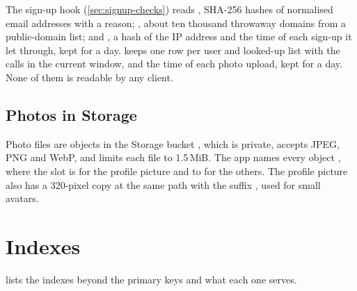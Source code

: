 The sign-up hook (\cref{sec:signup-checks}) reads , SHA-256 hashes of
normalised email addresses with a reason; , about ten thousand
throwaway domains from a public-domain list; and , a hash of the IP address and
the time of each sign-up it let through, kept for a day.  keeps one row per user
and looked-up list with the calls in the current window, and  the time of
each photo upload, kept for a day. None of them is readable by any client.

\subsection{Photos in Storage}

Photo files are objects in the Storage bucket , which is private, accepts JPEG, PNG and
WebP, and limits each file to 1.5\,MiB. The app names every object
, where the slot is  for the profile picture and
 to  for the others. The profile picture also has a 320-pixel copy at the same
path with the suffix , used for small avatars.

\section{Indexes}

 lists the indexes beyond the primary keys and what each one serves.

